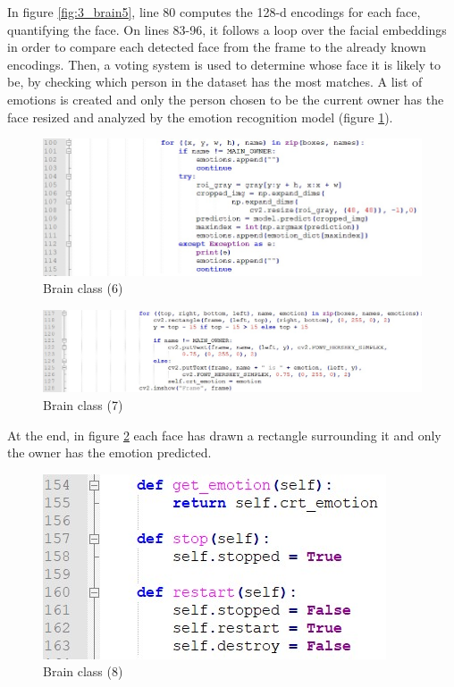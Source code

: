 \documentclass[runningheads,a4paper,12pt]{report}
\begin{document}
In figure \ref{fig:3_brain5}, line 80 computes the 128-d encodings for each face, quantifying the face. On lines 83-96, it follows a loop over the facial embeddings in order to compare each detected face from the frame to the already known encodings. Then, a voting system is used to determine whose face it is likely to be, by checking which person in the dataset has the most matches. A list of emotions is created and only the person chosen to be the current owner has the face resized and analyzed by the emotion recognition model (figure \ref{fig:3_brain6}). 

\begin{figure}[h]
	\centering
	\includegraphics[width=\linewidth]{./images/3_brain6}\hfill	
	\caption{Brain class (6)}  
    \label{fig:3_brain6}
\end{figure}

\begin{figure}[h]
	\centering
	\includegraphics[width=\linewidth]{./images/3_brain7}\hfill	
	\caption{Brain class (7)}  
    \label{fig:3_brain7}
\end{figure}

At the end, in figure \ref{fig:3_brain7} each face has drawn a rectangle surrounding it and only the owner has the emotion predicted. 

\begin{figure}[h]
	\centering
	\includegraphics[width=0.5\linewidth]{./images/3_brain8}\hfill	
	\caption{Brain class (8)}  
    \label{fig:3_brain8}
\end{figure}
\end{document}
